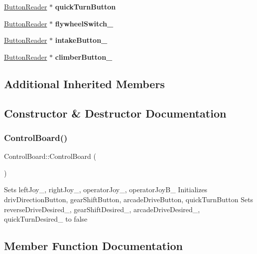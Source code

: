 \begin{DoxyCompactItemize}
\hyperlink{class_button_reader}{Button\+Reader} $\ast$ {\bfseries quick\+Turn\+Button}
\item 
\mbox{\label{class_control_board_ad6747a734d4ed1fca913d2780fd232d7}} 
\hyperlink{class_button_reader}{Button\+Reader} $\ast$ {\bfseries flywheel\+Switch\+\_\+}
\item 
\mbox{\label{class_control_board_afed51d92de45c22e8e5dd1a8185fdd43}} 
\hyperlink{class_button_reader}{Button\+Reader} $\ast$ {\bfseries intake\+Button\+\_\+}
\item 
\mbox{\label{class_control_board_a9a746d864f38612942a1fa913d884f3d}} 
\hyperlink{class_button_reader}{Button\+Reader} $\ast$ {\bfseries climber\+Button\+\_\+}
\end{DoxyCompactItemize}
\subsection*{Additional Inherited Members}


\subsection{Constructor \& Destructor Documentation}
\mbox{\label{class_control_board_abb5d54833e99fb1b46a51e61c6f18e6e}} 
\subsubsection{\texorpdfstring{Control\+Board()}{ControlBoard()}}
{\footnotesize\ttfamily Control\+Board\+::\+Control\+Board (\begin{DoxyParamCaption}{ }\end{DoxyParamCaption})}

Sets left\+Joy\+\_\+, right\+Joy\+\_\+, operator\+Joy\+\_\+, operator\+Joy\+B\+\_\+ Initializes driv\+Direction\+Button, gear\+Shift\+Button, arcade\+Drive\+Button, quick\+Turn\+Button Sets reverse\+Drive\+Desired\+\_\+, gear\+Shift\+Desired\+\_\+, arcade\+Drive\+Desired\+\_\+, quick\+Turn\+Desired\+\_\+ to false 

\subsection{Member Function Documentation}
\mbox{\label{class_control_board_ab32a6888112f807dff75acbb641a3517}} 
